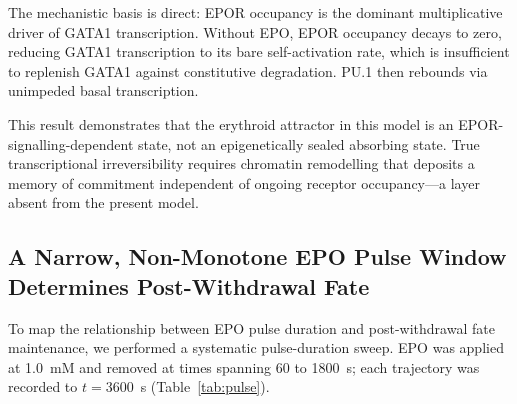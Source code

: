 The mechanistic basis is direct: EPOR occupancy is the dominant multiplicative
driver of GATA1 transcription. Without EPO, EPOR occupancy decays to zero,
reducing GATA1 transcription to its bare self-activation rate, which is
insufficient to replenish GATA1 against constitutive degradation. PU.1 then
rebounds via unimpeded basal transcription.

This result demonstrates that the erythroid attractor in this model is an
EPOR-signalling-dependent state, not an epigenetically sealed absorbing state.
True transcriptional irreversibility requires chromatin remodelling that deposits
a memory of commitment independent of ongoing receptor occupancy---a layer absent
from the present model.

\subsection{A Narrow, Non-Monotone EPO Pulse Window Determines Post-Withdrawal
Fate}
\label{sec:pulse}

To map the relationship between EPO pulse duration and post-withdrawal fate
maintenance, we performed a systematic pulse-duration sweep. EPO was applied at
1.0~mM and removed at times spanning 60 to 1800~s; each trajectory was recorded
to $t=3600$~s (Table~\ref{tab:pulse}).

\begin{table}[ht]
\caption{Pulse-duration sweep. EPO\,=\,1.0~mM applied for $t_{\mathrm{pulse}}$~s
then removed; GATA1$_\text{nuc}$ and PU.1$_\text{nuc}$ at $t=3600$~s.
The fate outcome is non-monotone: only the 120~s and 150~s pulses maintain
erythroid fate. Ghost-attractor reversal time scales systematically with pulse
length.}
\label{tab:pulse}
\centering
\small
{}
\end{table}

